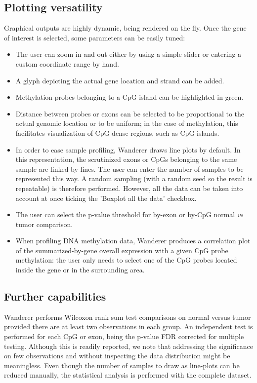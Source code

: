 \documentclass{bmcart}
\begin{document}
\subsection*{Plotting versatility}

Graphical outputs are highly dynamic, being rendered on the fly. {\color{red} Once the gene of interest is selected, some parameters can be easily tuned: }

\begin{itemize}
\item The user can zoom in and out either by using a simple slider or entering a custom coordinate range by hand. 
\item A glyph depicting the actual gene location and strand can be added. 
\item Methylation probes belonging to a CpG island can be highlighted in green. 
\item Distance between probes or exons can be selected to be proportional to the actual genomic location or to be uniform; in the case of methylation, this facilitates visualization of CpG-dense regions, such as CpG islands. 
\item In order to ease sample profiling, Wanderer draws line plots by default. In this representation, the scrutinized exons or CpGs belonging to the same sample are linked by lines. The user can enter the number of samples to be represented this way. A random sampling (with a random seed so the result is repeatable) is therefore performed. However, all the data can be taken into account at once ticking the 'Boxplot all the data' checkbox.
\item {\color{red} The user can select the p-value threshold for by-exon or by-CpG normal \textit{vs} tumor comparison.}
\item {\color{red} When profiling DNA methylation data, Wanderer produces a correlation plot of the summarized-by-gene overall expression with a given CpG probe methylation: the user only needs to select one of the CpG probes located inside the gene or in the surrounding area.}
\end{itemize}



\subsection*{Further capabilities}
Wanderer performs Wilcoxon rank sum test comparisons on normal versus tumor provided there are at least two observations in each group. An independent test is performed for each CpG or exon, being the p-value FDR corrected for multiple testing. Although this is readily reported, we note that addressing the significance on few observations and without inspecting the data distribution might be meaningless. Even though the number of samples to draw as line-plots can be reduced manually, the statistical analysis is performed with the complete dataset.\\
\end{document}
